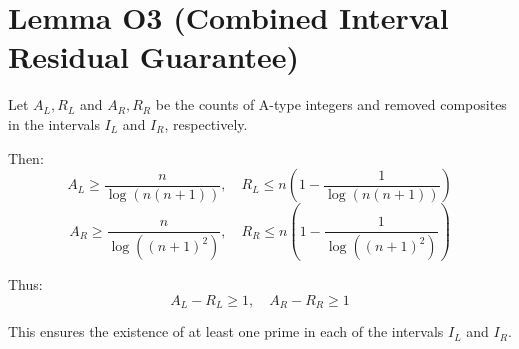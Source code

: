 
\section*{Lemma O3 (Combined Interval Residual Guarantee)}

Let \( A_L, R_L \) and \( A_R, R_R \) be the counts of A-type integers and removed composites in the intervals \( I_L \) and \( I_R \), respectively.

Then:
\[
A_L \geq \frac{n}{\log(n(n+1))}, \quad R_L \leq n \left(1 - \frac{1}{\log(n(n+1))} \right)
\]
\[
A_R \geq \frac{n}{\log((n+1)^2)}, \quad R_R \leq n \left(1 - \frac{1}{\log((n+1)^2)} \right)
\]

Thus:
\[
A_L - R_L \geq 1, \quad A_R - R_R \geq 1
\]

This ensures the existence of at least one prime in each of the intervals \( I_L \) and \( I_R \).
